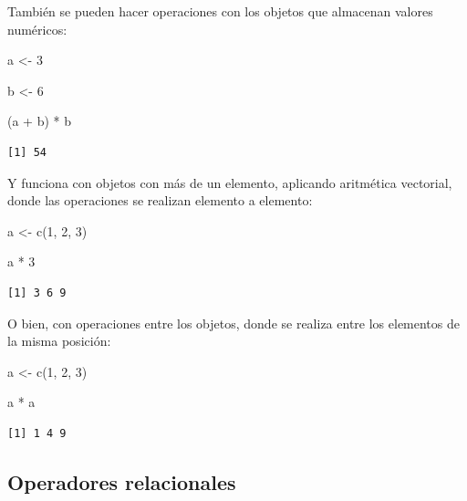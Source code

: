 \documentclass[
  spanish,
  letterpaper,
  DIV=11,
  numbers=noendperiod]{scrreprt}
\newenvironment{Shaded}{\begin{snugshade}}{\end{snugshade}}
\newcommand{\DecValTok}[1]{\textcolor[rgb]{0.68,0.00,0.00}{#1}}
\newcommand{\FunctionTok}[1]{\textcolor[rgb]{0.28,0.35,0.67}{#1}}
\newcommand{\NormalTok}[1]{\textcolor[rgb]{0.00,0.23,0.31}{#1}}
\newcommand{\OtherTok}[1]{\textcolor[rgb]{0.00,0.23,0.31}{#1}}
\newcommand{\SpecialCharTok}[1]{\textcolor[rgb]{0.37,0.37,0.37}{#1}}
\begin{document}
También se pueden hacer operaciones con los objetos que almacenan
valores numéricos:

\begin{Shaded}
\begin{Highlighting}[]
\NormalTok{a }\OtherTok{\textless{}{-}} \DecValTok{3}

\NormalTok{b }\OtherTok{\textless{}{-}} \DecValTok{6}

\NormalTok{(a }\SpecialCharTok{+}\NormalTok{ b) }\SpecialCharTok{*}\NormalTok{ b}
\end{Highlighting}
\end{Shaded}

\begin{verbatim}
[1] 54
\end{verbatim}

Y funciona con objetos con más de un elemento, aplicando aritmética
vectorial, donde las operaciones se realizan elemento a elemento:

\begin{Shaded}
\begin{Highlighting}[]
\NormalTok{a }\OtherTok{\textless{}{-}} \FunctionTok{c}\NormalTok{(}\DecValTok{1}\NormalTok{, }\DecValTok{2}\NormalTok{, }\DecValTok{3}\NormalTok{)}

\NormalTok{a }\SpecialCharTok{*} \DecValTok{3}
\end{Highlighting}
\end{Shaded}

\begin{verbatim}
[1] 3 6 9
\end{verbatim}

O bien, con operaciones entre los objetos, donde se realiza entre los
elementos de la misma posición:

\begin{Shaded}
\begin{Highlighting}[]
\NormalTok{a }\OtherTok{\textless{}{-}} \FunctionTok{c}\NormalTok{(}\DecValTok{1}\NormalTok{, }\DecValTok{2}\NormalTok{, }\DecValTok{3}\NormalTok{)}

\NormalTok{a }\SpecialCharTok{*}\NormalTok{ a}
\end{Highlighting}
\end{Shaded}

\begin{verbatim}
[1] 1 4 9
\end{verbatim}

\subsection{Operadores relacionales}\label{operadores-relacionales}
\end{document}
